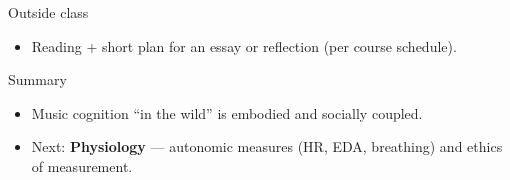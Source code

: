 \documentclass[aspectratio=169]{beamer}
\begin{document}
\begin{frame}{Outside class}
  \begin{itemize}
    \item Reading + short plan for an essay or reflection (per course schedule).
  \end{itemize}
\end{frame}

\begin{frame}{Summary}
  \begin{itemize}
    \item Music cognition ``in the wild'' is embodied and socially coupled.
    \item Next: \textbf{Physiology} — autonomic measures (HR, EDA, breathing) and ethics of measurement.
  \end{itemize}
\end{frame}
\end{document}
